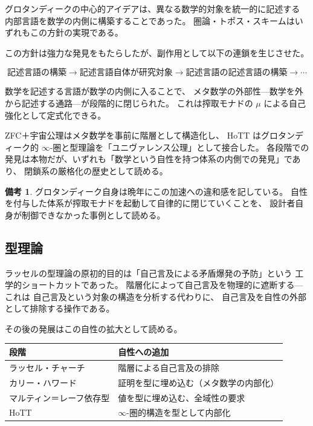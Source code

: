 \documentclass[11pt,a4paper]{article}
\theoremstyle{definition}
\newtheorem{remark}{備考}[section]
\begin{document}
グロタンディークの中心的アイデアは、異なる数学的対象を統一的に記述する
内部言語を数学の内側に構築することであった。
圏論・トポス・スキームはいずれもこの方針の実現である。

この方針は強力な発見をもたらしたが、副作用として以下の連鎖を生じさせた。

\begin{equation}
\text{記述言語の構築} \to \text{記述言語自体が研究対象} \to
\text{記述言語の記述言語の構築} \to \cdots
\end{equation}

数学を記述する言語が数学の内側に入ることで、
メタ数学の外部性---数学を外から記述する通路---が段階的に閉じられた。
これは搾取モナドの $\mu$ による自己強化として定式化できる。

ZFC＋宇宙公理はメタ数学を事前に階層として構造化し、
HoTT はグロタンディーク的 $\infty$-圏と型理論を「ユニヴァレンス公理」として接合した。
各段階での発見は本物だが、いずれも「数学という自性を持つ体系の内側での発見」であり、
閉鎖系の厳格化の歴史として読める。

\begin{remark}
グロタンディーク自身は晩年にこの加速への違和感を記している。
自性を付与した体系が搾取モナドを起動して自律的に閉じていくことを、
設計者自身が制御できなかった事例として読める。
\end{remark}

\subsection{型理論}

ラッセルの型理論の原初的目的は「自己言及による矛盾爆発の予防」という
工学的ショートカットであった。
階層化によって自己言及を物理的に遮断する---これは
自己言及という対象の構造を分析する代わりに、
自己言及を自性の外部として排除する操作である。

その後の発展はこの自性の拡大として読める。

\begin{center}
\begin{tabular}{ll}
\hline
\textbf{段階} & \textbf{自性への追加} \\
\hline
ラッセル・チャーチ & 階層による自己言及の排除 \\
カリー・ハワード & 証明を型に埋め込む（メタ数学の内部化） \\
マルティン＝レーフ依存型 & 値を型に埋め込む、全域性の要求 \\
HoTT & $\infty$-圏的構造を型として内部化 \\
\hline
\end{tabular}
\end{center}
\end{document}
